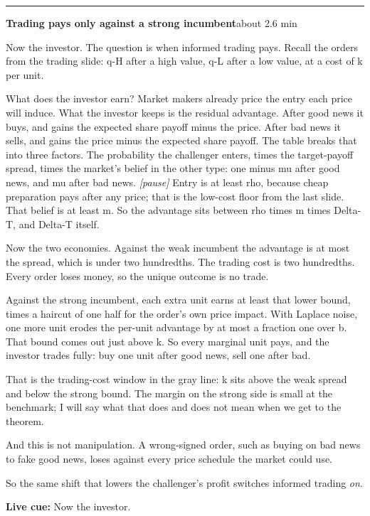 \documentclass[11pt]{article}
\newcommand{\Pause}{\textcolor{ScriptGray}{\textit{[pause]}}}
\newcommand{\Cue}[1]{\par\nobreak\smallskip\noindent
  \textcolor{ScriptGray}{\footnotesize\textbf{Live cue:} #1}\par}
\newcommand{\scriptframe}[3]{%
  \Needspace{9\baselineskip}%
  \par\medskip\noindent\textcolor{ScriptBlue}{\rule{\linewidth}{0.55pt}}%
  \par\smallskip\noindent
  \textbf{#1}\hfill\textcolor{ScriptGray}{\small #2}\par\smallskip
  #3\par}
\begin{document}
\scriptframe{Trading pays only against a strong incumbent}{about 2.6 min}{%
  Now the investor. The question is when informed trading pays. Recall the
  orders from the trading slide: q-H after a high value, q-L after a low value,
  at a cost of k per unit.

  What does the investor earn? Market makers already price the entry each
  price will induce. What the investor keeps is the residual advantage. After
  good news it buys, and gains the expected share payoff minus the price. After
  bad news it sells, and gains the price minus the expected share payoff. The
  table breaks that into three factors. The probability the challenger enters,
  times the target-payoff spread, times the market's belief in the other type:
  one minus mu after good news, and mu after bad news. \Pause{} Entry is at
  least rho, because cheap preparation pays after any price; that is the
  low-cost floor from the last slide. That belief is at least m. So the
  advantage sits between rho times m times Delta-T, and Delta-T itself.

  Now the two economies. Against the weak incumbent the advantage is at most the
  spread, which is under two hundredths. The trading cost is two hundredths.
  Every order loses money, so the unique outcome is no trade.

  Against the strong incumbent, each extra unit earns at least that lower bound,
  times a haircut of one half for the order's own price impact. With Laplace
  noise, one more unit erodes the per-unit advantage by at most a fraction one
  over b. That bound comes out just above k.
  So every marginal unit pays, and the investor trades fully: buy one unit after
  good news, sell one after bad.

  That is the trading-cost window in the gray line: k sits above the weak spread
  and below the strong bound. The margin on the strong side is small at the
  benchmark; I will say what that does and does not mean when we get to the
  theorem.

  And this is not manipulation. A wrong-signed order, such as buying on bad
  news to fake good news, loses against every price schedule the market could
  use.

  So the same shift that lowers the challenger's profit switches informed
  trading \emph{on}.
  \Cue{Now the investor.}
}
\end{document}
